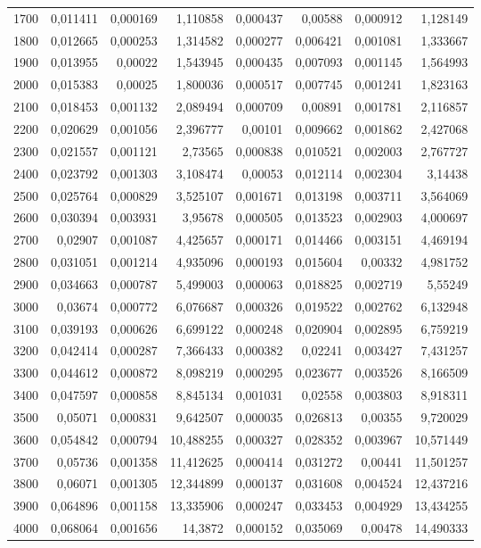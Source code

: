\begin{tabular}{r r r r r r r r}
1700 & 0,011411 & 0,000169 & 1,110858 & 0,000437 & 0,00588 & 0,000912 & 1,128149 \\
1800 & 0,012665 & 0,000253 & 1,314582 & 0,000277 & 0,006421 & 0,001081 & 1,333667 \\
1900 & 0,013955 & 0,00022 & 1,543945 & 0,000435 & 0,007093 & 0,001145 & 1,564993 \\
2000 & 0,015383 & 0,00025 & 1,800036 & 0,000517 & 0,007745 & 0,001241 & 1,823163 \\
2100 & 0,018453 & 0,001132 & 2,089494 & 0,000709 & 0,00891 & 0,001781 & 2,116857 \\
2200 & 0,020629 & 0,001056 & 2,396777 & 0,00101 & 0,009662 & 0,001862 & 2,427068 \\
2300 & 0,021557 & 0,001121 & 2,73565 & 0,000838 & 0,010521 & 0,002003 & 2,767727 \\
2400 & 0,023792 & 0,001303 & 3,108474 & 0,00053 & 0,012114 & 0,002304 & 3,14438 \\
2500 & 0,025764 & 0,000829 & 3,525107 & 0,001671 & 0,013198 & 0,003711 & 3,564069 \\
2600 & 0,030394 & 0,003931 & 3,95678 & 0,000505 & 0,013523 & 0,002903 & 4,000697 \\
2700 & 0,02907 & 0,001087 & 4,425657 & 0,000171 & 0,014466 & 0,003151 & 4,469194 \\
2800 & 0,031051 & 0,001214 & 4,935096 & 0,000193 & 0,015604 & 0,00332 & 4,981752 \\
2900 & 0,034663 & 0,000787 & 5,499003 & 0,000063 & 0,018825 & 0,002719 & 5,55249 \\
3000 & 0,03674 & 0,000772 & 6,076687 & 0,000326 & 0,019522 & 0,002762 & 6,132948 \\
3100 & 0,039193 & 0,000626 & 6,699122 & 0,000248 & 0,020904 & 0,002895 & 6,759219 \\
3200 & 0,042414 & 0,000287 & 7,366433 & 0,000382 & 0,02241 & 0,003427 & 7,431257 \\
3300 & 0,044612 & 0,000872 & 8,098219 & 0,000295 & 0,023677 & 0,003526 & 8,166509 \\
3400 & 0,047597 & 0,000858 & 8,845134 & 0,001031 & 0,02558 & 0,003803 & 8,918311 \\
3500 & 0,05071 & 0,000831 & 9,642507 & 0,000035 & 0,026813 & 0,00355 & 9,720029 \\
3600 & 0,054842 & 0,000794 & 10,488255 & 0,000327 & 0,028352 & 0,003967 & 10,571449 \\
3700 & 0,05736 & 0,001358 & 11,412625 & 0,000414 & 0,031272 & 0,00441 & 11,501257 \\
3800 & 0,06071 & 0,001305 & 12,344899 & 0,000137 & 0,031608 & 0,004524 & 12,437216 \\
3900 & 0,064896 & 0,001158 & 13,335906 & 0,000247 & 0,033453 & 0,004929 & 13,434255 \\
4000 & 0,068064 & 0,001656 & 14,3872 & 0,000152 & 0,035069 & 0,00478 & 14,490333 \\
\end{tabular}

